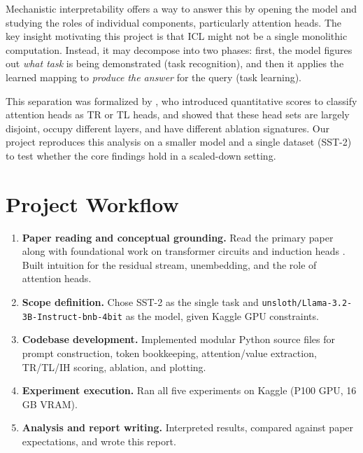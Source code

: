\documentclass[twoside,english]{article}
\begin{document}
Mechanistic interpretability offers a way to answer this by opening the model and studying the roles of individual components, particularly attention heads. The key insight motivating this project is that ICL might not be a single monolithic computation. Instead, it may decompose into two phases: first, the model figures out \textit{what task} is being demonstrated (task recognition), and then it applies the learned mapping to \textit{produce the answer} for the query (task learning).

This separation was formalized by \cite{TSLA}, who introduced quantitative scores to classify attention heads as TR or TL heads, and showed that these head sets are largely disjoint, occupy different layers, and have different ablation signatures. Our project reproduces this analysis on a smaller model and a single dataset (SST-2) to test whether the core findings hold in a scaled-down setting.

\section{Project Workflow} \label{sec:workflow}

\begin{enumerate}
    \item \textbf{Paper reading and conceptual grounding.} Read the primary paper \cite{TSLA} along with foundational work on transformer circuits \cite{TransformerCircuits} and induction heads \cite{InductionHeads}. Built intuition for the residual stream, unembedding, and the role of attention heads.
    \item \textbf{Scope definition.} Chose SST-2 as the single task and \texttt{unsloth/Llama-3.2-3B-Instruct-bnb-4bit} as the model, given Kaggle GPU constraints.
    \item \textbf{Codebase development.} Implemented modular Python source files for prompt construction, token bookkeeping, attention/value extraction, TR/TL/IH scoring, ablation, and plotting.
    \item \textbf{Experiment execution.} Ran all five experiments on Kaggle (P100 GPU, 16 GB VRAM).
    \item \textbf{Analysis and report writing.} Interpreted results, compared against paper expectations, and wrote this report.
\end{enumerate}
\end{document}
